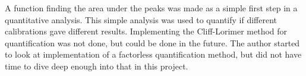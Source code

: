 
A function finding the area under the peaks was made as a simple first step in a quantitative analysis.
This simple analysis was used to quantify if different calibrations gave different results.
Implementing the Cliff-Lorimer method for quantification was not done, but could be done in the future.
The author started to look at implementation of a factorless quantification method, but did not have time to dive deep enough into that in this project.




